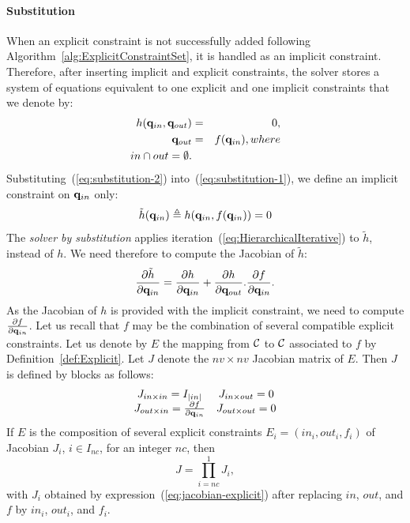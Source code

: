 \paragraph{Substitution} When an explicit constraint is not successfully added following Algorithm~\ref{alg:ExplicitConstraintSet}, it is handled as an implicit constraint. Therefore, after inserting implicit and explicit constraints, the solver stores a system of equations equivalent to one explicit and one implicit constraints that we denote by:
\begin{eqnarray}\label{eq:substitution-1}
  h(\conf_{in},\conf_{out}) &=& 0, \\
  \label{eq:substitution-2}
  \conf_{out} &=& f(\conf_{in}), \mbox{ where }\\
  \label{eq:substitution-3}
  {in}\cap{out}=\emptyset.
\end{eqnarray}
Substituting~(\ref{eq:substitution-2}) into~(\ref{eq:substitution-1}), we define an implicit constraint on $\mathbf{q}_{in}$ only:
$$
\tilde{h}(\mathbf{q}_{in}) \triangleq h(\mathbf{q}_{in}, f(\mathbf{q}_{in})) = 0
$$
The \textit{solver by substitution} applies iteration~(\ref{eq:HierarchicalIterative}) to $\tilde{h}$, instead of $h$. We need therefore to compute the Jacobian of  $\tilde{h}$:
$$
\frac{\partial \tilde{h}}{\partial \mathbf{q}_{in}}  =
\frac{\partial h}{\partial \mathbf{q}_{in}} + \frac{\partial h}{\partial \mathbf{q}_{out}}.
\frac{\partial f}{\partial \mathbf{q}_{in}}.
$$
As the Jacobian of $h$ is provided with the implicit constraint, we need to compute $\frac{\partial f}{\partial \mathbf{q}_{in}}$. Let us recall that $f$ may be the combination of several compatible explicit constraints. Let us denote by $E$ the mapping from $\mathcal{C}$ to $\mathcal{C}$ associated to $f$ by Definition~\ref{def:Explicit}.
Let $J$ denote the $nv\times nv$ Jacobian matrix of $E$. Then $J$ is defined by blocks as follows:
\begin{equation}\label{eq:jacobian-explicit}
\begin{array}{cc}
  J_{{in}\times{in}} = I_{|{in}|} & J_{{in}\times{out}} = 0 \\
  J_{{out}\times{in}} = \frac{\partial f}{\partial \conf_{in}} & J_{{out}\times{out}} = 0
\end{array}
\end{equation}
If $E$ is the composition of several explicit constraints $E_i=(in_i,out_i,f_i)$ of Jacobian $J_i$, $i\in I_{nc}$, for an integer $nc$, then
\begin{equation}\label{eq:jacobian-product}
J = \prod_{i=nc}^{1} J_{i},
\end{equation}
with $J_i$ obtained by expression~(\ref{eq:jacobian-explicit}) after replacing $in$, $out$, and $f$ by $in_i$, $out_i$, and $f_i$.

